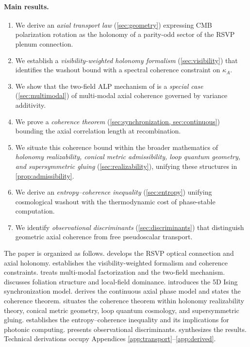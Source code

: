 \documentclass[12pt]{article}
\theoremstyle{definition}
\newcommand{\kA}{\kappa_A}
\begin{document}
\paragraph{Main results.}
\begin{enumerate}[leftmargin=1.8em,itemsep=2pt]
  \item We derive an \emph{axial transport law} (\cref{sec:geometry})
        expressing CMB polarization rotation as the holonomy of a
        parity-odd sector of the RSVP plenum connection.
  \item We establish a \emph{visibility-weighted holonomy formalism}
        (\cref{sec:visibility}) that identifies the washout bound with a
        spectral coherence constraint on $\kA$.
  \item We show that the two-field ALP mechanism of
        \cite{ShaoObataZhang2025} is a \emph{special case}
        (\cref{sec:multimodal}) of multi-modal axial coherence
        governed by variance additivity.
  \item We prove a \emph{coherence theorem} (\cref{sec:synchronization,
        sec:continuous}) bounding the axial correlation length at
        recombination.
  \item We situate this coherence bound within the broader mathematics
        of \emph{holonomy realizability, conical metric admissibility,
        loop quantum geometry, and supersymmetric gluing}
        (\cref{sec:realizability}), unifying these structures in
        \cref{prop:admissibility}.
  \item We derive an \emph{entropy--coherence inequality}
        (\cref{sec:entropy}) unifying cosmological washout with the
        thermodynamic cost of phase-stable computation.
  \item We identify \emph{observational discriminants}
        (\cref{sec:discriminants}) that distinguish geometric axial
        coherence from free pseudoscalar transport.
\end{enumerate}

\medskip
The paper is organized as follows.
 develops the RSVP optical connection and axial
holonomy.
 establishes the visibility-weighted formalism and
coherence constraints.
 treats multi-modal factorization and the two-field
mechanism.
 discusses foliation structure and local-field dominance.
 introduces the 5D Ising synchronization model.
 derives the continuous axial phase model and states
the coherence theorem.
 situates the coherence theorem within holonomy
realizability theory, conical metric geometry, loop quantum cosmology,
and supersymmetric gluing.
 establishes the entropy--coherence inequality and its
implications for photonic computing.
 presents observational discriminants.
 synthesizes the results.
Technical derivations occupy Appendices \ref{app:transport}--\ref{app:derived}.
\end{document}
